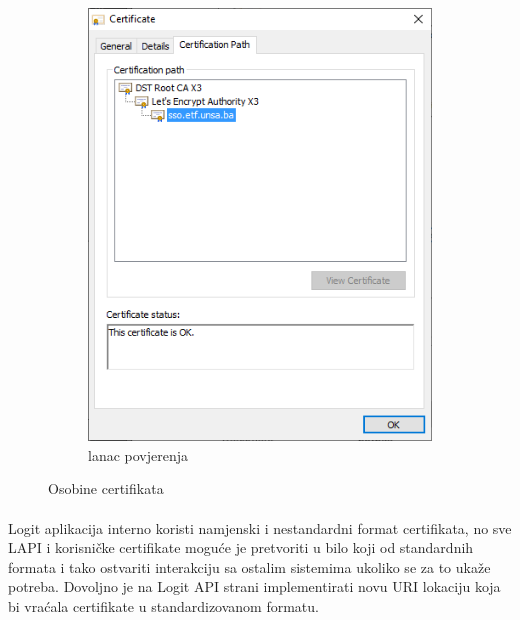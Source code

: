 \begin{figure}[H]
\begin{subfigure}{.5\textwidth}
        \includegraphics[width=1\textwidth]{material/etf_cert_tree}
        \caption{lanac povjerenja}
        \label{img:etf_cert_tree}
    \end{subfigure}
    \caption{Osobine certifikata}%
    \label{img:etf_cert}
\end{figure}

\paragraph*{}
Logit aplikacija interno koristi namjenski i nestandardni format certifikata, no sve LAPI i korisničke certifikate moguće je pretvoriti u bilo koji od standardnih formata i tako ostvariti interakciju sa ostalim sistemima ukoliko se za to ukaže potreba. Dovoljno je na Logit API strani implementirati novu URI lokaciju koja bi vraćala certifikate u standardizovanom formatu.